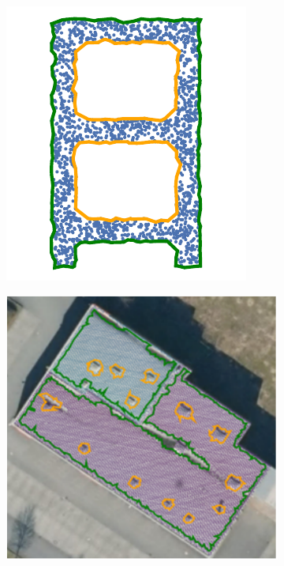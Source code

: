 \begin{figure}[t]
\begin{subfigure}[t]{.22\linewidth}
    \centering\includegraphics[width=.95\linewidth]{chapter_3_polylidar3d/imgs/concave_vs_convex_lettera_3.pdf}
    \caption{\label{fig:ch1_convex_concave_2}}
  \end{subfigure}
  \begin{subfigure}[t]{.26\linewidth}
    \centering\includegraphics[width=.95\linewidth]{chapter_1_intro/imgs/rooftop_example_simple.pdf}

\end{subfigure}
\end{figure}
